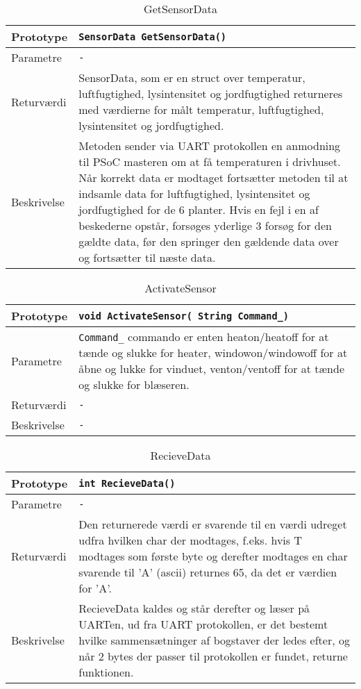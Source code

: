\begin{table}[h]
\begin{tabularx}{\textwidth}{| L{2.5 cm} | Z |} \hline
Prototype & \texttt{SensorData GetSensorData()} \\\hline
Parametre & \texttt{-} \\\hline
Returværdi & SensorData, som er en struct over temperatur, luftfugtighed, lysintensitet og jordfugtighed returneres med værdierne for målt temperatur, luftfugtighed, lysintensitet og jordfugtighed. \\\hline
Beskrivelse & Metoden sender via UART protokollen en anmodning til PSoC masteren om at få temperaturen i drivhuset. Når korrekt data er modtaget fortsætter metoden til at indsamle data for luftfugtighed, lysintensitet og jordfugtighed for de 6 planter. Hvis en fejl i en af beskederne opstår, forsøges yderlige 3 forsøg for den gældte data, før den springer den gældende data over og fortsætter til næste data.  \\\hline
\end{tabularx}
\caption{GetSensorData}
\label{table:UART_GetSensorData}
\end{table}

\clearpage

\begin{table}[h]
\begin{tabularx}{\textwidth}{| L{2.5 cm} | Z |} \hline
Prototype & \texttt{void ActivateSensor( String Command\_)} \\\hline
Parametre & \texttt{Command\_} \newline
commando er enten heaton/heatoff for at tænde og slukke for heater, windowon/windowoff for at åbne og lukke for vinduet, venton/ventoff for at tænde og slukke for blæseren. \\\hline
Returværdi & \texttt{-} \\\hline
Beskrivelse & \texttt{-} \\\hline
\end{tabularx}
\caption{ActivateSensor}
\label{table:UART_ActivateSensor}
\end{table}

\begin{table}[h]
\begin{tabularx}{\textwidth}{| L{2.5 cm} | Z |} \hline
Prototype & \texttt{int RecieveData()} \\\hline
Parametre & \texttt{-} \\\hline
Returværdi & Den returnerede værdi er svarende til en værdi udreget udfra hvilken char der modtages, f.eks. hvis T modtages som første byte og derefter modtages en char svarende til ’A’ (ascii) returnes 65, da det er værdien for ’A’. \\\hline
Beskrivelse & RecieveData kaldes og står derefter og læser på UARTen, ud fra UART protokollen, er det bestemt hvilke sammensætninger af bogstaver der ledes efter, og når 2 bytes der passer til protokollen er fundet, returne funktionen. \\\hline
\end{tabularx}
\caption{RecieveData}
\label{table:UART_RecieveData}
\end{table}

